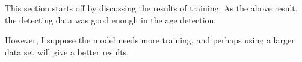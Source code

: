 \begin{Discussion}
This section starts off by discussing the results of training. As the above result, the detecting data was good enough in the age detection. 

However, I suppose the model needs more training, and perhaps using a larger data set will give a better results.



\end{Discussion}
